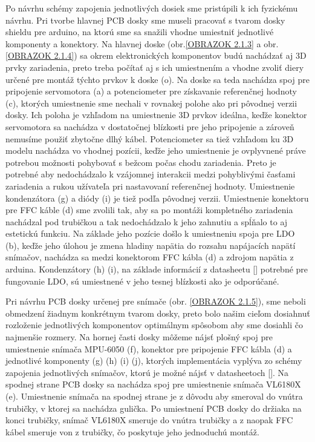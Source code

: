  
Po návrhu schémy zapojenia jednotlivých dosiek sme pristúpili k ich fyzickému návrhu. Pri tvorbe hlavnej PCB dosky sme museli pracovať s tvarom dosky shieldu pre arduino, na ktorú sme sa snažili vhodne umiestniť jednotlivé komponenty a konektory.  Na hlavnej doske (obr.\ref{OBRAZOK 2.1.3} a obr.\ref{OBRAZOK 2.1.4}) sa okrem elektronických komponentov budú nachádzať aj 3D prvky zariadenia, preto treba počítať aj s ich umiestnením a vhodne zvoliť diery určené pre montáž týchto prvkov k doske (o). Na doske sa teda nachádza spoj pre pripojenie servomotora (a) a  potenciometer pre získavanie referenčnej hodnoty (c), ktorých umiestnenie sme nechali v rovnakej polohe ako pri pôvodnej verzii dosky. Ich poloha je vzhľadom na umiestnenie 3D prvkov ideálna, keďže konektor servomotora sa nachádza v dostatočnej blízkosti pre jeho pripojenie a zároveň nemusíme použiť zbytočne dlhý kábel. Potenciometer sa tiež vzhľadom ku 3D modelu nachádza vo vhodnej pozícii, keďže jeho umiestnenie je ovplyvnené práve potrebou možnosti pohybovať s bežcom počas chodu zariadenia. Preto je potrebné aby nedochádzalo k vzájomnej interakcii medzi pohyblivými časťami zariadenia a rukou užívateľa pri nastavovaní referenčnej hodnoty. Umiestnenie kondenzátora (g) a diódy (i) je tiež podľa pôvodnej verzii. Umiestnenie konektoru pre FFC káble (d) sme zvolili tak, aby sa po montáži kompletného zariadenia nachádzal pod trubičkou a tak nedochádzalo k jeho zahnutiu a spĺňalo to aj estetickú funkciu. Na základe jeho pozície došlo k umiestneniu spoja pre LDO (b), keďže jeho úlohou je zmena hladiny napätia do rozsahu napájacích napätí snímačov, nachádza sa medzi konektorom FFC kábla (d) a zdrojom napätia z arduina.  Kondenzátory (h) (i), na základe informácií z datasheetu [] potrebné pre fungovanie LDO, sú umiestnené v jeho tesnej blízkosti ako je odporúčané.

Pri návrhu PCB dosky určenej pre snímače (obr. \ref{OBRAZOK 2.1.5}), sme neboli obmedzení žiadnym konkrétnym tvarom dosky, preto bolo našim cieľom dosiahnuť rozloženie jednotlivých komponentov optimálnym spôsobom aby sme dosiahli čo najmenšie rozmery. Na hornej časti dosky môžeme nájsť plošný spoj pre umiestnenie snímača MPU-6050 (f), konektor pre pripojenie FFC kábla (d) a jednotlivé komponenty (g) (h) (i) (j), ktorých implementácia vyplýva zo schémy zapojenia jednotlivých snímačov, ktorú je možné nájsť v datasheetoch []. Na spodnej strane PCB dosky sa nachádza spoj pre umiestnenie snímača VL6180X (e). Umiestnenie snímača na spodnej strane je z dôvodu aby smeroval do vnútra trubičky, v ktorej sa nachádza gulička. Po umiestnení PCB dosky do držiaka na konci trubičky, snímač VL6180X smeruje do vnútra trubičky a z naopak FFC kábel smeruje von z trubičky, čo poskytuje jeho jednoduchú montáž. 

